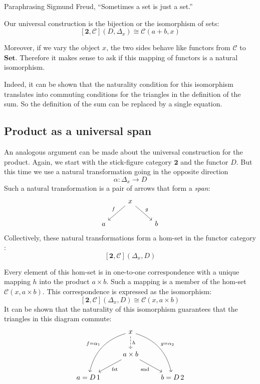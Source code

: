 \documentclass[DaoFP]{subfiles}
\begin{document}
Paraphrasing Sigmund Freud, ``Sometimes a set is just a set.''

Our universal construction is the bijection or the isomorphism of sets:
\[ [\mathbf{2}, \mathcal{C}](D, \Delta_x)  \cong \mathcal{C}(a + b, x) \]

Moreover, if we vary the object $x$, the two sides behave like functors from  $\mathcal{C}$ to $\mathbf{Set}$. Therefore it makes sense to ask if this mapping of functors is a natural isomorphism. 

Indeed, it can be shown that the naturality condition for this isomorphism translates into commuting conditions for the triangles in the definition of the sum. So the definition of the sum can be replaced by a single equation.

\subsection{Product as a universal span}

An analogous argument can be made about the universal construction for the product. Again, we start with the stick-figure category $\mathbf{2}$ and the functor $D$. But this time we use a natural transformation going in the opposite direction
\[ \alpha \colon \Delta_x \to D \]
Such a natural transformation is a pair of arrows that form a \emph{span}:
\[
 \begin{tikzcd}
 &x
 \arrow[dl, "f"']
 \arrow[dr, "g"]
 \\
 a
 && b
  \end{tikzcd}
\]
Collectively, these natural transformations form a hom-set in the functor category :
\[[\mathbf{2}, \mathcal{C}](\Delta_x, D) \]

Every element of this hom-set is in one-to-one correspondence with a unique mapping $h$ into the product $a \times b$. Such a mapping is a member of the hom-set $\mathcal{C}(x, a \times b)$. This correspondence is expressed as the isomorphism:
\[ [\mathbf{2}, \mathcal{C}](\Delta_x, D)  \cong \mathcal{C}(x, a \times b) \]
It can be shown that the naturality of this isomorphism guarantees that the triangles in this diagram commute:
\[
 \begin{tikzcd}
 & x
\arrow[d, dashed, "h"]
 \arrow[ddl, bend right, "f = \alpha_1"']
 \arrow[ddr, bend left, "g = \alpha_2"]
\\
&a \times b
 \arrow[dl,  "\text{fst}"]
  \arrow[dr,   "\text{snd}"']
\\
a = D\, 1 && b = D \, 2
 \end{tikzcd}
\]
\end{document}
